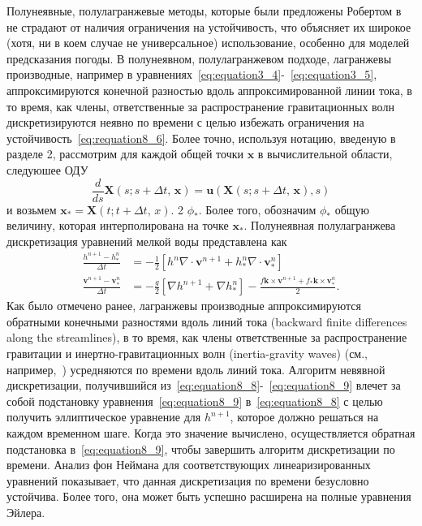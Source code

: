 Полунеявные, полулагранжевые методы, которые были предложены Робертом в~\cite{A60} не страдают от наличия ограничения на устойчивость, что объясняет их широкое (хотя, ни в коем случае не универсальное) использование, особенно для моделей предсказания погоды. В полунеявном, полулагранжевом подходе, лагранжевы производные, например в уравнениях~\eqref{eq:equation3_4}-~\eqref{eq:equation3_5}, аппроксимируются конечной разностью вдоль аппроксимированной линии тока, в то время, как члены, ответственные за распространение гравитационных волн дискретизируются неявно по времени с целью избежать ограничения на устойчивость~\eqref{eq:requation8_6}. Более точно, используя нотацию, введеную в разделе 2, рассмотрим для каждой общей точки $\mathbf{x}$ в вычислительной области, следуюшее ОДУ
% 
\begin{equation}
\label{eq:equation8_7}
\frac{d}{ds}\mathbf{X}(s;s+\Delta t,\,\mathbf{x})=\mathbf{u}(\mathbf{X}(s;s+\Delta t,\,\mathbf{x}), s)
\end{equation}
%
и возьмем $\mathbf{x}_{*}=\mathbf{X}(t; t + \Delta t,\,x).$ 2 $\phi_*$. Более того, обозначим $\phi_*$ общую величину, которая интерполирована на точке $\mathbf{x}_*$. Полунеявная полулагранжева дискретизация уравнений мелкой воды представлена как
%
\begin{align}
\label{eq:equation8_8}
\frac{h^{n+1}-h_{*}^n}{\Delta t}&=-\frac{1}{2} [h^n\nabla \cdot \mathbf{v}^{n+1} + h_*^n \nabla \cdot \mathbf{v}_{*}^n] \\
\label{eq:equation8_9}
\frac{\mathbf{v}^{n+1}-\mathbf{v}_{*}^n}{\Delta t}&=-\frac{g}{2}[\nabla h^{n+1}+\nabla h_{*}^n] - \frac{f\mathbf{k}\times\mathbf{v}^{n+1}+f_{*}\mathbf{k}\times\mathbf{v}_{*}^n}{2}.
\end{align}
%
Как было отмечено ранее, лагранжевы производные аппроксимируются обратными конечными разностями вдоль линий тока (backward finite differences along the streamlines), в то время, как члены ответственные за распространение гравитации и инертно-гравитационных волн (inertia-gravity waves) (см., например,~\cite{A49}) усредняются по времени вдоль линий тока. Алгоритм невявной дискретизации, получившийся из~\eqref{eq:equation8_8}-~\eqref{eq:equation8_9} влечет за собой подстановку уравнения~\eqref{eq:equation8_9} в~\eqref{eq:equation8_8} с целью получить эллиптическое уравнение для $h^{n+1}$, которое должно решаться на каждом временном шаге. Когда это значение вычислено, осуществляется обратная подстановка в~\eqref{eq:equation8_9}, чтобы завершить алгоритм дискретизации по времени. Анализ фон Неймана для соответствующих линеаризированных уравнений показывает, что данная дискретизация по времени безусловно устойчива. Более того, она может быть успешно расширена на полные уравнения Эйлера.

